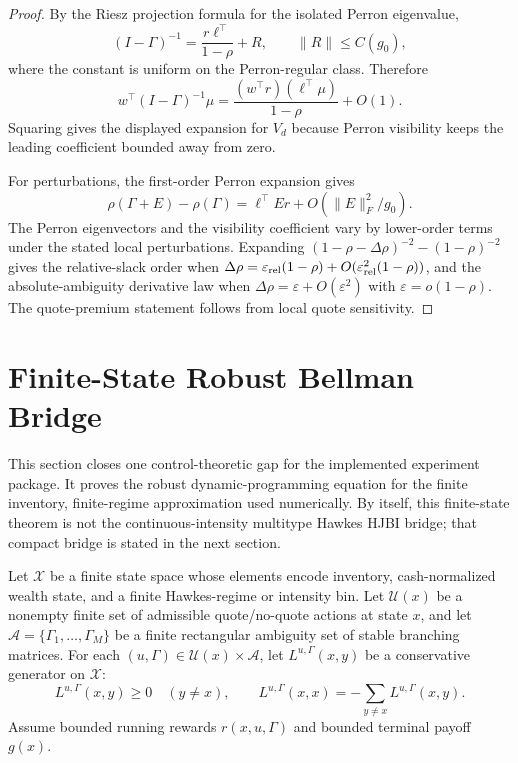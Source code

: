 \documentclass[11pt]{article}
\newcommand{\eps}{\varepsilon}
\begin{document}
\begin{proof}
By the Riesz projection formula for the isolated Perron eigenvalue,
\[
(I-\Gamma)^{-1}=\frac{r\ell^\top}{1-\rho}+R,
\qquad \|R\|\le C(g_0),
\]
where the constant is uniform on the Perron-regular class. Therefore
\[
w^\top(I-\Gamma)^{-1}\mu
=\frac{(w^\top r)(\ell^\top\mu)}{1-\rho}+O(1).
\]
Squaring gives the displayed expansion for $V_d$ because Perron visibility
keeps the leading coefficient bounded away from zero.

For perturbations, the first-order Perron expansion gives
\[
\rho(\Gamma+E)-\rho(\Gamma)
=\ell^\top E r+O(\|E\|_F^2/g_0).
\]
The Perron eigenvectors and the visibility coefficient vary by lower-order
terms under the stated local perturbations. Expanding
$(1-\rho-\Delta\rho)^{-2}-(1-\rho)^{-2}$ gives the relative-slack order when
$\Delta\rho=\eps_{\rm rel}(1-\rho)+O(\eps_{\rm rel}^2(1-\rho))$, and the
absolute-ambiguity derivative law when $\Delta\rho=\eps+O(\eps^2)$ with
$\eps=o(1-\rho)$. The quote-premium statement follows from local quote
sensitivity.
\end{proof}

\section{Finite-State Robust Bellman Bridge}

This section closes one control-theoretic gap for the implemented experiment
package. It proves the robust dynamic-programming equation for the finite
inventory, finite-regime approximation used numerically. By itself, this
finite-state theorem is not the continuous-intensity multitype Hawkes HJBI
bridge; that compact bridge is stated in the next section.

Let $\mathcal X$ be a finite state space whose elements encode inventory,
cash-normalized wealth state, and a finite Hawkes-regime or intensity bin. Let
$\mathcal U(x)$ be a nonempty finite set of admissible quote/no-quote actions
at state $x$, and let $\mathcal A=\{\Gamma_1,\ldots,\Gamma_M\}$ be a finite
rectangular ambiguity set of stable branching matrices. For each
$(u,\Gamma)\in\mathcal U(x)\times\mathcal A$, let
$L^{u,\Gamma}(x,y)$ be a conservative generator on $\mathcal X$:
\[
L^{u,\Gamma}(x,y)\ge0\quad (y\ne x),
\qquad
L^{u,\Gamma}(x,x)=-\sum_{y\ne x}L^{u,\Gamma}(x,y).
\]
Assume bounded running rewards $r(x,u,\Gamma)$ and bounded terminal payoff
$g(x)$.
\end{document}
